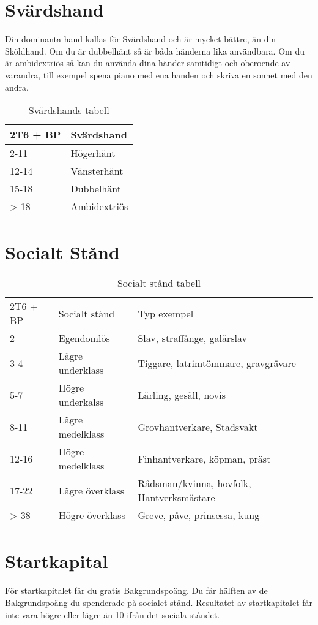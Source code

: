 \documentclass[a4paper, 10pt, titlepage]{article}
\begin{document}
\section{Svärdshand}
Din dominanta hand kallas för Svärdshand och är mycket bättre, än din
Sköldhand. Om du är dubbelhänt så är båda händerna lika användbara.
Om du är ambidextriös så kan du använda dina händer samtidigt och oberoende
av varandra, till exempel spena piano med ena handen och skriva en sonnet med
den andra.

\begin{table}[hbp]
  \caption{Svärdshands tabell}
  \begin{tabular}{|l|l|}
    \hline
    2T6 + BP & Svärdshand \\
    \hline
    2-11     & Högerhänt \\
    \hline
    12-14    & Vänsterhänt \\
    \hline
    15-18    & Dubbelhänt \\
    \hline
    > 18     & Ambidextriös \\
    \hline
  \end{tabular}
\end{table}

\section{Socialt Stånd}
\begin{table}[hbp]
  \caption{Socialt stånd tabell}
  \begin{tabular}{|l|l|l|}
    \hline
    2T6 + BP & Socialt stånd    & Typ exempel \\
    2        & Egendomlös       & Slav, straffånge, galärslav\\
    3-4      & Lägre underklass & Tiggare, latrimtömmare, gravgrävare  \\
    5-7      & Högre underkalss & Lärling, gesäll, novis \\
    8-11     & Lägre medelklass & Grovhantverkare, Stadsvakt \\
    12-16    & Högre medelklass & Finhantverkare, köpman, präst \\
    17-22    & Lägre överklass  & Rådsman/kvinna, hovfolk, Hantverksmästare \\
    > 38     & Högre överklass  & Greve, påve, prinsessa, kung \\
  \end{tabular}
\end{table}

\section{Startkapital}
För startkapitalet får du gratis Bakgrundspoäng. Du får hälften av de Bakgrundspoäng du spenderade
på socialet stånd. Resultatet av startkapitalet får inte vara högre eller lägre än 10 ifrån
det sociala ståndet.
\end{document}
